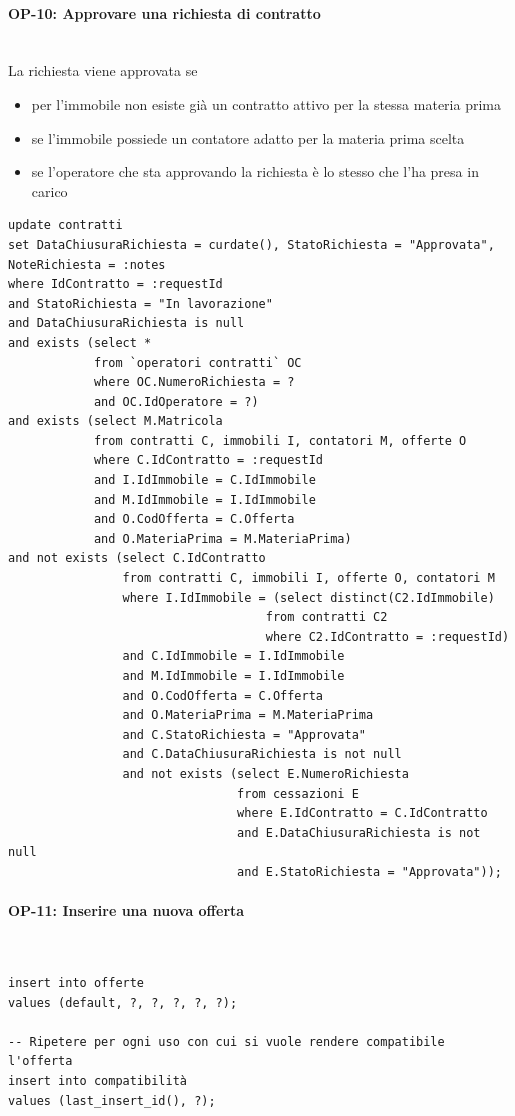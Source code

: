 \documentclass[a4paper,12pt]{report}
\begin{document}
\paragraph{OP-10: Approvare una richiesta di contratto}\mbox{}\\
La richiesta viene approvata se 
\begin{itemize}
    \item per l'immobile non esiste già un contratto attivo per la stessa materia prima
    \item se l'immobile possiede un contatore adatto per la materia prima scelta
    \item se l'operatore che sta approvando la richiesta è lo stesso che l'ha presa in carico
\end{itemize}
\begin{lstlisting}
update contratti
set DataChiusuraRichiesta = curdate(), StatoRichiesta = "Approvata", NoteRichiesta = :notes
where IdContratto = :requestId
and StatoRichiesta = "In lavorazione"
and DataChiusuraRichiesta is null
and exists (select *
            from `operatori contratti` OC
            where OC.NumeroRichiesta = ?
            and OC.IdOperatore = ?)
and exists (select M.Matricola
            from contratti C, immobili I, contatori M, offerte O
            where C.IdContratto = :requestId
            and I.IdImmobile = C.IdImmobile
            and M.IdImmobile = I.IdImmobile
            and O.CodOfferta = C.Offerta
            and O.MateriaPrima = M.MateriaPrima)
and not exists (select C.IdContratto
                from contratti C, immobili I, offerte O, contatori M
                where I.IdImmobile = (select distinct(C2.IdImmobile)
                                    from contratti C2
                                    where C2.IdContratto = :requestId)
                and C.IdImmobile = I.IdImmobile
                and M.IdImmobile = I.IdImmobile
                and O.CodOfferta = C.Offerta
                and O.MateriaPrima = M.MateriaPrima
                and C.StatoRichiesta = "Approvata"
                and C.DataChiusuraRichiesta is not null
                and not exists (select E.NumeroRichiesta
                                from cessazioni E
                                where E.IdContratto = C.IdContratto
                                and E.DataChiusuraRichiesta is not null
                                and E.StatoRichiesta = "Approvata"));
\end{lstlisting}

\paragraph{OP-11: Inserire una nuova offerta}\mbox{}\\
\begin{lstlisting}
insert into offerte
values (default, ?, ?, ?, ?, ?);

-- Ripetere per ogni uso con cui si vuole rendere compatibile l'offerta
insert into compatibilità
values (last_insert_id(), ?);
\end{lstlisting}
    
\end{document}
